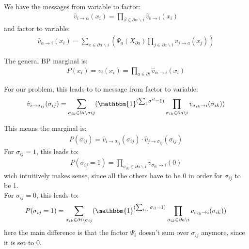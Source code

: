 \documentclass[a4paper]{scrartcl}
\begin{document}
{
\color{red}
We have the messages from variable to factor:
\begin{align}
    \hat{v}_{i \rightarrow \alpha}(x_i) = \prod_{\beta \in \partial \alpha \backslash i} \hat{v}_{b \rightarrow i}(x_i)
\end{align}
and factor to variable:
\begin{align}
    \hat{v}_{\alpha \rightarrow i}(x_i) = \sum_{x \in \partial \alpha \backslash i} (\Psi_a(X_{\partial a}) \prod_{j \in \partial a \backslash i} v_{j \rightarrow a}(x_j))
\end{align}

The general BP marginal is:
\begin{align}
    P(x_i) = v_i(x_i) = \prod_{a \in \partial i} \hat{v}_{\alpha \rightarrow i}(x_i)
\end{align}

For our problem, this leads to to message from factor to variable:
\begin{align}
    \hat{v}_{i \rightarrow \sigma_{ij}}(\sigma_{ij}) &= \sum_{\sigma_{ik} \in \partial i \backslash \sigma{ij}} (\mathbbm{1}^{(\sum_l \sigma^{il} = 1)} \prod_{\sigma_{ik} \in \partial a \backslash i} v_{\sigma_{ik} \rightarrow i}(\sigma_{ik}))\\
\end{align}

This means the marginal is:
\begin{align}
    P(\sigma_{ij}) = \hat{v}_{i \rightarrow \sigma_{ij}}(\sigma_{ij}) \cdot \hat{v}_{j \rightarrow \sigma_{ij}}(\sigma_{ij})
\end{align}
For $\sigma_{ij}=1$, this leads to:
\begin{align}
    P(\sigma_{ij}=1) =  \prod_{\sigma_{ik} \in \partial a \backslash i} v_{\sigma_{ik} \rightarrow i}(0)
\end{align}
wich intuitively makes sense, since all the others have to be 0 in order for $\sigma_{ij}$ to be 1.\\
For $\sigma_{ij}=0$, this leads to:
\begin{align}
    P(\sigma_{ij}=1) = \sum_{\sigma_{ik} \in \partial i \backslash \sigma_{ij}} (\mathbbm{1}^{(\sum_{l \backslash i} \sigma_{il} = 1)} \prod_{\sigma_{ik} \in \partial a \backslash i} v_{\sigma_{ik} \rightarrow i}(\sigma_{ik}))\\
\end{align}
here the main difference is that the factor $\Psi_{i}$ doesn't sum over $\sigma_{ij}$ anymore, since it is set to 0.


}
\end{document}
